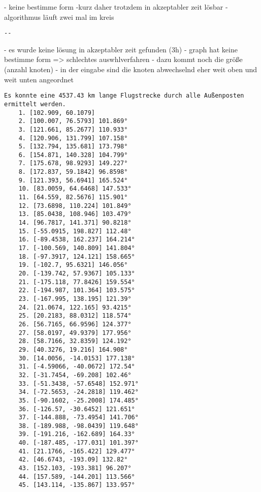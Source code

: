 \documentclass[a4paper,10pt,ngerman]{scrartcl}
\begin{document}
    - keine bestimme form
    -kurz daher trotzdem in akzeptabler zeit lösbar
    - algorithmus läuft zwei mal im kreis

    \begin{lstlisting}[frame=single, title=Programmausgabe wenigerkrumm5.txt, breaklines=true,label={lst:lstlisting4}]
        --
    \end{lstlisting}

    - es wurde keine lösung in akzeptabler zeit gefunden (3h)
    - graph hat keine bestimme form => schlechtes auswhlverfahren
    - dazu kommt noch die größe (anzahl knoten)
    - in der eingabe sind die knoten abwechselnd eher weit oben und weit unten angeordnet

    \begin{lstlisting}[frame=single, title=Programmausgabe wenigerkrumm6.txt, breaklines=true,label={lst:lstlisting4}]
    Es konnte eine 4537.43 km lange Flugstrecke durch alle Außenposten ermittelt werden.
    1. [102.909, 60.1079]
    2. [100.007, 76.5793] 101.869°
    3. [121.661, 85.2677] 110.933°
    4. [120.906, 131.799] 107.158°
    5. [132.794, 135.681] 173.798°
    6. [154.871, 140.328] 104.799°
    7. [175.678, 98.9293] 149.227°
    8. [172.837, 59.1842] 96.8598°
    9. [121.393, 56.6941] 165.524°
    10. [83.0059, 64.6468] 147.533°
    11. [64.559, 82.5676] 115.901°
    12. [73.6898, 110.224] 101.849°
    13. [85.0438, 108.946] 103.479°
    14. [96.7817, 141.371] 90.8218°
    15. [-55.0915, 198.827] 112.48°
    16. [-89.4538, 162.237] 164.214°
    17. [-100.569, 140.809] 141.804°
    18. [-97.3917, 124.121] 158.665°
    19. [-102.7, 95.6321] 146.056°
    20. [-139.742, 57.9367] 105.133°
    21. [-175.118, 77.8426] 159.554°
    22. [-194.987, 101.364] 103.575°
    23. [-167.995, 138.195] 121.39°
    24. [21.0674, 122.165] 93.4215°
    25. [20.2183, 88.0312] 118.574°
    26. [56.7165, 66.9596] 124.377°
    27. [58.0197, 49.9379] 177.956°
    28. [58.7166, 32.8359] 124.192°
    29. [40.3276, 19.216] 164.908°
    30. [14.0056, -14.0153] 177.138°
    31. [-4.59066, -40.0672] 172.54°
    32. [-31.7454, -69.208] 102.46°
    33. [-51.3438, -57.6548] 152.971°
    34. [-72.5653, -24.2818] 119.462°
    35. [-90.1602, -25.2008] 174.485°
    36. [-126.57, -30.6452] 121.651°
    37. [-144.888, -73.4954] 141.706°
    38. [-189.988, -98.0439] 119.648°
    39. [-191.216, -162.689] 164.33°
    40. [-187.485, -177.031] 101.397°
    41. [21.1766, -165.422] 129.477°
    42. [46.6743, -193.09] 132.82°
    43. [152.103, -193.381] 96.207°
    44. [157.589, -144.201] 113.566°
    45. [143.114, -135.867] 133.957°

\end{lstlisting}
\end{document}
